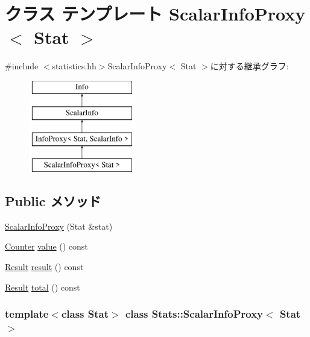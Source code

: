 \hypertarget{classStats_1_1ScalarInfoProxy}{
\section{クラス テンプレート ScalarInfoProxy$<$ Stat $>$}
\label{classStats_1_1ScalarInfoProxy}
}


{\ttfamily \#include $<$statistics.hh$>$}ScalarInfoProxy$<$ Stat $>$に対する継承グラフ:\begin{figure}[H]
\begin{center}
\leavevmode
\includegraphics[height=4cm]{classStats_1_1ScalarInfoProxy}
\end{center}
\end{figure}
\subsection*{Public メソッド}
\begin{DoxyCompactItemize}
\item 
\hyperlink{classStats_1_1ScalarInfoProxy_a39ef59666de4af87e1c0d348150af616}{ScalarInfoProxy} (Stat \&stat)
\item 
\hyperlink{namespaceStats_ac35128c026c72bb36af9cea00774e8a6}{Counter} \hyperlink{classStats_1_1ScalarInfoProxy_aa9e486cb7eb0ad44f5f89923594b68a4}{value} () const 
\item 
\hyperlink{namespaceStats_ad874d2cfd4b4a29ebd480bb2e67f20ae}{Result} \hyperlink{classStats_1_1ScalarInfoProxy_ae050da86c3d8e8a677a0bdeb7971e1e3}{result} () const 
\item 
\hyperlink{namespaceStats_ad874d2cfd4b4a29ebd480bb2e67f20ae}{Result} \hyperlink{classStats_1_1ScalarInfoProxy_a35c6e2ed3fc81b40d69052a062113ead}{total} () const 
\end{DoxyCompactItemize}
\subsubsection*{template$<$class Stat$>$ class Stats::ScalarInfoProxy$<$ Stat $>$}



